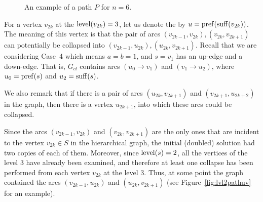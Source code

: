 \begin{figure}[ht]
\begin{center}

\end{center}

\caption{An example of a path $P$ for $n=6$.}\label{fig:lvl2path6}
\end{figure}

For a vertex $v_{2k}$ at the $\operatorname{level} (v_{2k}) = 3 $, let us denote the by $u=\operatorname{pref}(\operatorname{suff}(v_{2k}))$. The meaning of this vertex is that the pair of arcs $( v_{2k-1}, v_{2k}), (v_{2k}, v_{2k + 1})$ can potentially be collapsed into $( v_{2k-1}, u_{2k}), (u_{2k}, v_{2k + 1})$. Recall that we are considering Case~4 which means $a=b=1$, and $s=v_1$ has an up-edge and a down-edge. That is, $ G_{cl} $ contains arcs $ (u_0 \to v_1) $ and $ (v_1 \to u_2) $, where $ u_0 = \operatorname{pref} (s) $ and $ u_2 = \operatorname{suff} (s) $. 

We also remark that if there is a pair of arcs $ (u_{2k}, v_{2k + 1}) $ and $ (v_{2k + 1}, u_{2k + 2}) $ in the graph, then there is a vertex $ u_{2k + 1} $, into which these arcs could be collapsed.

Since the arcs $ (v_{2k-1}, v_{2k}) $ and $ (v_{2k} , v_{2k + 1}) $ are the only ones that are incident to the vertex $ v_{2k} \in S $ in the hierarchical graph, the initial (doubled) solution had two copies of each of them. Moreover, since $ \operatorname{level} (s) = 2 $, all the vertices of the level $ 3 $ have already been examined, and therefore at least one collapse has been performed from each vertex $ v_ {2k} $ at the level $ 3 $. Thus, at some point the graph contained the arcs $ (v_{2k-1} , u_{2k}) $ and $ (u_{2k}, v_{2k + 1}) $ (see Figure~\ref {fig:lvl2pathuv} for an example).

